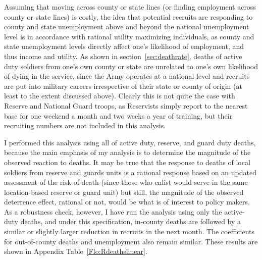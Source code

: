 \documentclass[12pt] {article}
\begin{document}


Assuming that moving across county or state lines (or finding employment across
county or state lines) is costly, the idea that potential recruits are responding to county and state unemployment above and beyond the national unemployment level is in
accordance with rational utility maximizing individuals, as county and state unemployment
levels directly affect one's likelihood of employment, and thus income
and utility. As shown in section~\ref{sec:deathrate}, deaths of active duty soldiers from one's own county or state are unrelated to one's own likelihood of dying in the service,
since the Army operates at a national level and recruits are put into
military careers irrespective of their state or county of origin (at
least to the extent discussed above). Clearly this is not quite the
case with Reserve and National Guard troops, as Reservists simply
report to the nearest base for one weekend a month and two weeks
a year of training, but their recruiting numbers are not included
in this analysis.


I performed this analysis using all of active duty, reserve, and guard duty deaths, because the main emphasis of my analysis is to determine the magnitude of the observed reaction to deaths. It may be true that the response to deaths of local soldiers from
reserve and guards units is a rational response based on an updated
assessment of the risk of death (since those who enlist would serve in the same location-based reserve or guard unit) but still, the magnitude of the observed
deterrence effect, rational or not, would be what is of interest to
policy makers. As a robustness check, however, I have run the analysis
using only the active-duty deaths, and under this specification, in-county
deaths are followed by a similar or slightly larger reduction in recruits in the
next month. The coefficients for out-of-county deaths and unemployment also
remain similar. These results are shown in Appendix Table~\ref{Flo:Rdeathslinear}. 
\end{document}
